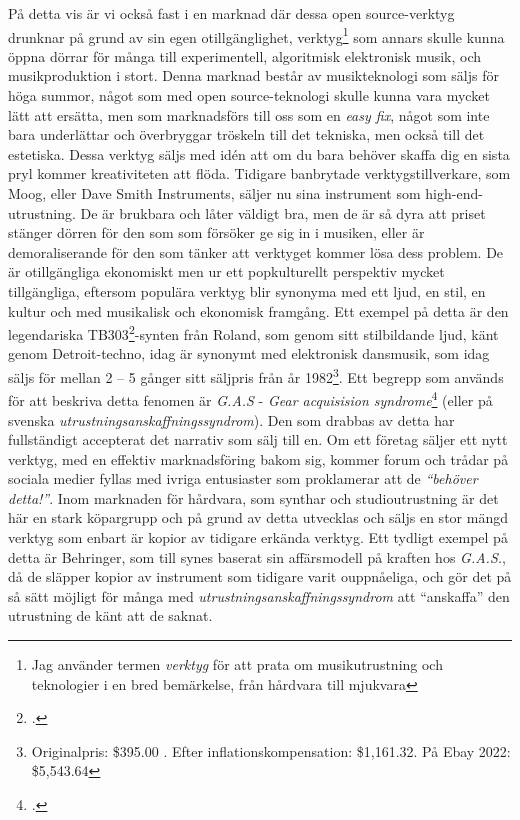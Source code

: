 \documentclass{article}
\begin{document}
På detta vis är vi också fast i en marknad där dessa open source-verktyg drunknar på grund av sin egen
otillgänglighet, verktyg\footnote{Jag använder termen \emph{verktyg} för att prata om musikutrustning och
teknologier i en bred bemärkelse, från hårdvara till mjukvara} som annars skulle kunna öppna dörrar för många
till experimentell, algoritmisk elektronisk musik, och musikproduktion i stort. Denna marknad består av
musikteknologi som säljs för höga summor, något som med open source-teknologi skulle kunna vara mycket lätt
att ersätta, men som marknadsförs till oss som en \emph{easy fix}, något som inte bara underlättar och
överbryggar tröskeln till det tekniska, men också till det estetiska. Dessa verktyg säljs med idén att om du
bara behöver skaffa dig en sista pryl kommer kreativiteten att flöda. Tidigare banbrytade verktygstillverkare,
som Moog, eller Dave Smith Instruments, säljer nu sina instrument som high-end-utrustning. De är brukbara och
låter väldigt bra, men de är så dyra att priset stänger dörren för den som som försöker ge sig in i musiken,
eller är demoraliserande för den som tänker att verktyget kommer lösa dess problem. De är otillgängliga
ekonomiskt men ur ett popkulturellt perspektiv mycket tillgängliga, eftersom populära verktyg blir synonyma
med ett ljud, en stil, en kultur och med musikalisk och ekonomisk framgång. Ett exempel på detta är den
legendariska TB303\footcite{303}-synten från Roland, som genom sitt stilbildande ljud, känt genom
Detroit-techno, idag är synonymt med elektronisk dansmusik, som idag säljs för mellan 2 -- 5 gånger sitt
säljpris från år 1982\footnote{Originalpris: \$395.00 . Efter inflationskompensation: \$1,161.32. På Ebay
2022: \$5,543.64}. Ett begrepp som används för att beskriva detta fenomen är \emph{G.A.S} - \emph{Gear
acquisision syndrome}\footcite{gas} (eller på svenska \emph{utrustningsanskaffningssyndrom}). Den som drabbas
av detta har fullständigt accepterat det narrativ som sälj till en.
Om ett företag säljer ett nytt verktyg, med en effektiv marknadsföring bakom sig, kommer forum och trådar på
sociala medier fyllas med ivriga entusiaster som proklamerar att de \emph{``behöver detta!''}. Inom marknaden
för hårdvara, som synthar och studioutrustning är det här en stark köpargrupp och på grund av detta utvecklas
och säljs en stor mängd verktyg som enbart är kopior av tidigare erkända verktyg. Ett tydligt exempel på detta
är Behringer, som till synes baserat sin affärsmodell på kraften hos \emph{G.A.S.}, då de släpper kopior av
instrument som tidigare varit ouppnåeliga, och gör det på så sätt möjligt för många med
\emph{utrustningsanskaffningssyndrom} att ``anskaffa'' den utrustning de känt att de saknat.
\end{document}
